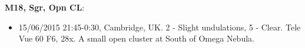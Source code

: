 {\bf M18, Sgr, Opn CL}:
\begin{itemize}
\item 15/06/2015 21:45-0:30, Cambridge, UK. 2 - Slight undulations, 5 - Clear. Tele Vue 60 F6, 28x. A small open cluster at South of Omega Nebula.
\end{itemize}
